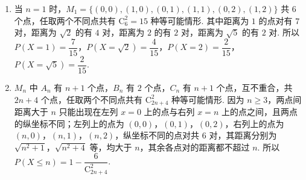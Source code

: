 \begin{solution}
\begin{enumerate}
\item 当 \(n=1\) 时，\(M_1=\{(0,0),(1,0),(0,1),(1,1),(0,2),(1,2)\}\) 共 \(6\) 个点，任取两个不同点共有 \(\mathrm C_6^2=15\) 种等可能情形. 其中距离为 \(1\) 的点对有 \(7\) 对，距离为 \(\sqrt2\) 的有 \(4\) 对，距离为 \(2\) 的有 \(2\) 对，距离为 \(\sqrt5\) 的有 \(2\) 对. 所以 \(P(X=1)=\dfrac7{15}\)，\(P(X=\sqrt2)=\dfrac4{15}\)，\(P(X=2)=\dfrac2{15}\)，\(P(X=\sqrt5)=\dfrac2{15}\).
\item \(M_n\) 中 \(A_n\) 有 \(n+1\) 个点，\(B_n\) 有 \(2\) 个点，\(C_n\) 有 \(n+1\) 个点，互不重合，共 \(2n+4\) 个点，任取两个不同点共有 \(\mathrm C_{2n+4}^2\) 种等可能情形. 因为 \(n\ge3\)，两点间距离大于 \(n\) 只能出现在左列 \(x=0\) 上的点与右列 \(x=n\) 上的点之间，且两点的纵坐标不同；左列上的点为 \((0,0)\)，\((0,1)\)，\((0,2)\)，右列上的点为 \((n,0)\)，\((n,1)\)，\((n,2)\)，纵坐标不同的点对共 \(6\) 对，其距离分别为 \(\sqrt{n^2+1}\)，\(\sqrt{n^2+4}\) 等，均大于 \(n\)，其余各点对的距离都不超过 \(n\). 所以 \(P(X\le n)=1-\dfrac6{\mathrm C_{2n+4}^2}\).
\end{enumerate}
\end{solution}
